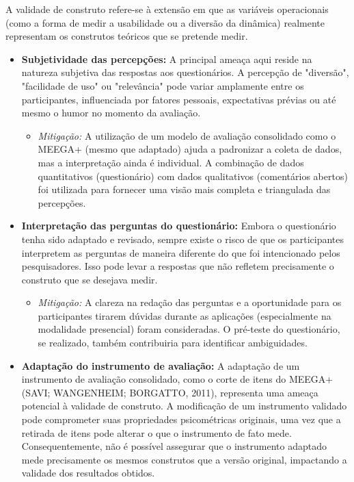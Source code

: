 \documentclass[
	12pt,
	openright,
	twoside,
	a4paper,
	english,
	brazil
	]{abntex2}
\begin{document}
A validade de construto refere-se à extensão em que as variáveis operacionais (como a forma de medir a usabilidade ou a diversão da dinâmica) realmente representam os construtos teóricos que se pretende medir.
\begin{itemize}
  \item \textbf{Subjetividade das percepções:} A principal ameaça aqui reside na natureza subjetiva das respostas aos questionários. A percepção de "diversão", "facilidade de uso" ou "relevância" pode variar amplamente entre os participantes, influenciada por fatores pessoais, expectativas prévias ou até mesmo o humor no momento da avaliação.
  \begin{itemize}
    \item \textit{Mitigação:} A utilização de um modelo de avaliação consolidado como o MEEGA+ (mesmo que adaptado) ajuda a padronizar a coleta de dados, mas a interpretação ainda é individual. A combinação de dados quantitativos (questionário) com dados qualitativos (comentários abertos) foi utilizada para fornecer uma visão mais completa e triangulada das percepções.
    \end{itemize}
  \item \textbf{Interpretação das perguntas do questionário:} Embora o questionário tenha sido adaptado e revisado, sempre existe o risco de que os participantes interpretem as perguntas de maneira diferente do que foi intencionado pelos pesquisadores. Isso pode levar a respostas que não refletem precisamente o construto que se desejava medir.
  \begin{itemize}
    \item \textit{Mitigação:} A clareza na redação das perguntas e a oportunidade para os participantes tirarem dúvidas durante as aplicações (especialmente na modalidade presencial) foram consideradas. O pré-teste do questionário, se realizado, também contribuiria para identificar ambiguidades.
    \end{itemize}
  \item \textbf{Adaptação do instrumento de avaliação:} A adaptação de um instrumento de avaliação consolidado, como o corte de itens do MEEGA+ (SAVI; WANGENHEIM; BORGATTO, 2011), representa uma ameaça potencial à validade de construto. A modificação de um instrumento validado pode comprometer suas propriedades psicométricas originais, uma vez que a retirada de itens pode alterar o que o instrumento de fato mede. Consequentemente, não é possível assegurar que o instrumento adaptado mede precisamente os mesmos construtos que a versão original, impactando a validade dos resultados obtidos.

\end{itemize}
\end{document}
